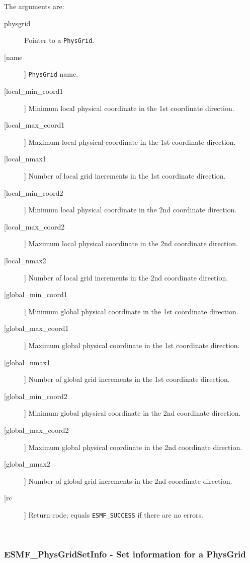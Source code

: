        The arguments are:
       \begin{description}
       \item[physgrid] 
            Pointer to a {\tt PhysGrid}.
       \item[[name]]
            {\tt PhysGrid} name.
       \item[[local\_min\_coord1]]
            Minimum local physical coordinate in the 1st coordinate direction.
       \item[[local\_max\_coord1]]
            Maximum local physical coordinate in the 1st coordinate direction.
       \item[[local\_nmax1]]
            Number of local grid increments in the 1st coordinate direction.
       \item[[local\_min\_coord2]]
            Minimum local physical coordinate in the 2nd coordinate direction.
       \item[[local\_max\_coord2]]
            Maximum local physical coordinate in the 2nd coordinate direction.
       \item[[local\_nmax2]]
            Number of local grid increments in the 2nd coordinate direction.
       \item[[global\_min\_coord1]]
            Minimum global physical coordinate in the 1st coordinate direction.
       \item[[global\_max\_coord1]]
            Maximum global physical coordinate in the 1st coordinate direction.
       \item[[global\_nmax1]]
            Number of global grid increments in the 1st coordinate direction.
       \item[[global\_min\_coord2]]
            Minimum global physical coordinate in the 2nd coordinate direction.
       \item[[global\_max\_coord2]]
            Maximum global physical coordinate in the 2nd coordinate direction.
       \item[[global\_nmax2]]
            Number of global grid increments in the 2nd coordinate direction.
       \item[[rc]] 
            Return code; equals {\tt ESMF\_SUCCESS} if there are no errors.
       \end{description}
   
 
\mbox{}\hrulefill\ 
 
\subsubsection{ESMF\_PhysGridSetInfo - Set information for a PhysGrid}


